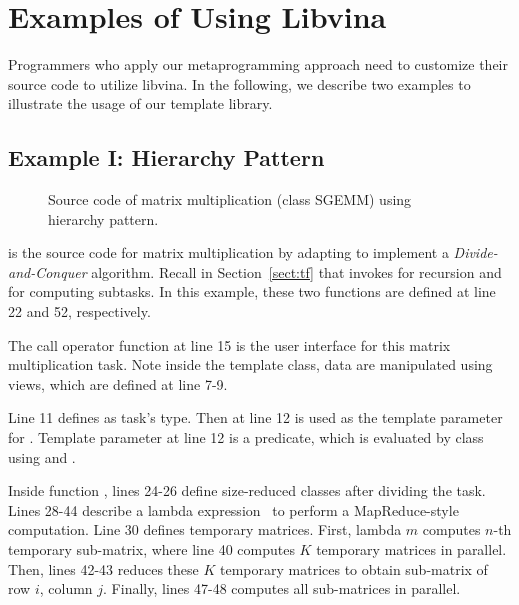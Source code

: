 \section{Examples of Using Libvina}
\label{sec:adaption}

Programmers who apply our metaprogramming approach need to customize their
source code to utilize libvina.
In the following, we describe two examples 
to illustrate the usage of our template library. 


\subsection{Example I: Hierarchy Pattern}

\begin{figure}[hbt]
  \caption{Source code of matrix multiplication (class SGEMM) using hierarchy pattern.}
  \label{fig:sgemm}
\end{figure}

 is the source code for matrix multiplication by adapting 
to implement a \emph{Divide-and-Conquer} algorithm. Recall in Section~\ref{sect:tf} that
 invokes  for recursion and 
for computing subtasks. In this example, these two functions are defined at line
22 and 52, respectively.

The call operator function at line 15 is the user interface for this matrix multiplication task.
Note inside the template class, data are manipulated using views, which are defined
at line 7-9.

Line 11 defines  as task's type. Then at line 12  is used as
the template parameter  for . Template parameter  
at line 12 is a predicate, which is evaluated by  class 
using  and .

Inside function , lines 24-26 define size-reduced classes after dividing the task. 
Lines 28-44 describe a lambda expression~\cite{cpplambda} to perform a MapReduce-style computation.
Line 30 defines temporary matrices.
First, lambda $m$ computes $n$-th temporary sub-matrix, where line 40 computes
$K$ temporary matrices in parallel. Then, lines 42-43 reduces these
$K$ temporary matrices to obtain sub-matrix of row $i$, column $j$. 
Finally, lines 47-48 computes all sub-matrices in parallel.

